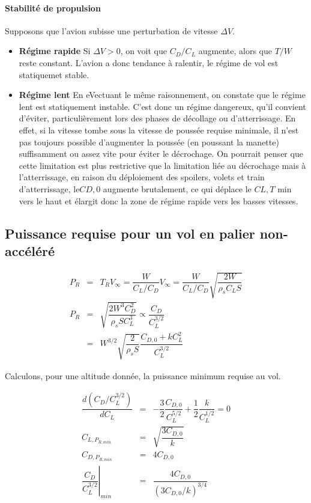 \documentclass{report}
\begin{document}
\paragraph{Stabilité de propulsion} Supposons que l'avion subisse une perturbation de vitesse $\Delta V$.
\begin{itemize}
    \item \textbf{Régime rapide}  Si $\Delta V>0$, on voit que $C_D/C_L$ augmente, alors que $T/W$ reste constant. L'avion a donc tendance à ralentir, le régime de vol est statiquemet stable.
    \item \textbf{Régime lent}  En eVectuant le même raisonnement, on constate que le régime lent est statiquement instable. C’est donc un régime dangereux, qu’il convient d’éviter, particulièrement lors des phases de décollage ou d’atterrissage. En effet, si la vitesse tombe sous la vitesse de poussée requise minimale, il n’est pas toujours possible d’augmenter la poussée (en poussant la manette) suffisamment ou assez vite pour éviter le décrochage. On pourrait penser que cette limitation est plus restrictive que la limitation liée au décrochage mais à l’atterrissage, en raison du déploiement des spoilers, volets et train d’atterrissage, le$C{D,0}$ augmente brutalement, ce qui déplace le $C{L,T}$ min vers le haut et élargit donc la zone de régime rapide vers les basses vitesses.
\end{itemize}

\subsection{Puissance requise pour un vol en palier non-accéléré}

\begin{eqnarray}
P_R &= &T_RV_\infty =\dfrac{W}{C_L/C_D}V_\infty = \dfrac{W}{C_L/C_D}\sqrt{\dfrac{2W}{\rho_s C_L S}}\\
P_R &= &\sqrt{\dfrac{2W^3C_D^2}{\rho_s S C_L^3}}\propto \dfrac{C_D}{C_L^{3/2}}\\
& = &W^{3/2}\sqrt{\dfrac{2}{\rho_s S}}\dfrac{C_{D,0}+kC_L^2}{C_L^{3/2}}
\end{eqnarray}

Calculons, pour une altitude donnée, la puissance minimum requise au vol.

\begin{eqnarray}
\dfrac{d(C_D/C_L^{3/2})}{dC_L} &= &-\dfrac{3}{2}\dfrac{C_{D,0}}{C_L^{5/2}}+\dfrac{1}{2}\dfrac{k}{C_L^{1/2}}=0\\
C_{L,P_{R,min}} &= &\sqrt{\dfrac{3C_{D,0}}{k}}\\
C_{D,P_{R,min}} &= &4C_{D,0}\\
\left.\dfrac{C_D}{C_L^{3/2}}\right|_{min} &= &\dfrac{4C_{D,0}}{(3C_{D,0}/k)^{3/4}}
\end{eqnarray}
\end{document}
